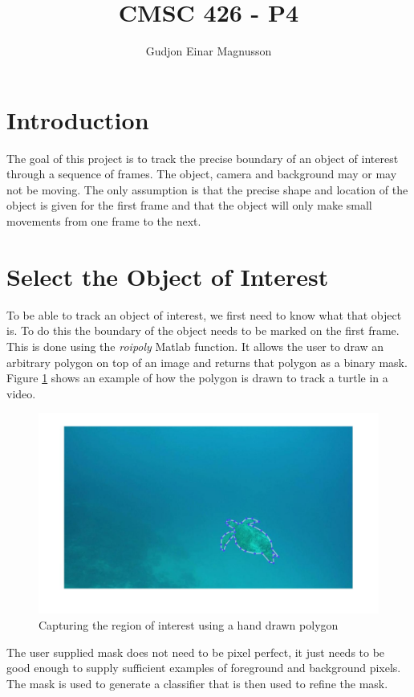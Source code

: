 \documentclass[12pt]{article}
\begin{document}
\title{CMSC 426 - P4}
\author{Gudjon Einar Magnusson}

\maketitle

\section{Introduction}

The goal of this project is to track the precise boundary of an object of interest through a sequence of frames. The object, camera and background may or may not be moving. The only assumption is that the precise shape and location of the object is given for the first frame and that the object will only make small movements from one frame to the next.

\section{Select the Object of Interest}

To be able to track an object of interest, we first need to know what that object is. To do this the boundary of the object needs to be marked on the first frame. This is done using the \textit{roipoly} Matlab function. It allows the user to draw an arbitrary polygon on top of an image and returns that polygon as a binary mask. Figure \ref{fig_roi1} shows an example of how the polygon is drawn to track a turtle in a video.

\begin{figure}
	\centering
    \includegraphics[width=0.6\linewidth]{img/video1_mask1}
    \caption{Capturing the region of interest using a hand drawn polygon}
    \label{fig_roi1}
\end{figure}

The user supplied mask does not need to be pixel perfect, it just needs to be good enough to supply sufficient examples of foreground and background pixels. The mask is used to generate a classifier that is then used to refine the mask.
\end{document}

